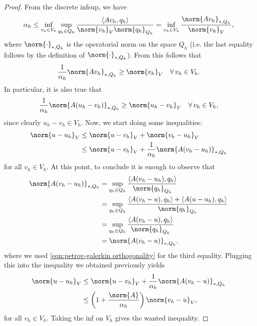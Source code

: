 \begin{proof}
    From the discrete infsup, we have
    \begin{equation*}
        \alpha_h\leq \inf_{v_h\in V_h}\sup_{q_h\in Q_h}\frac{\langle Av_h,q_h \rangle}{\norm{v_h}_V\norm{q_h}_{Q_h}}= \inf_{v_h\in V_h}\frac{\norm{Av_h}_{*,Q_h}}{\norm{v_h}_V},
    \end{equation*}
    where $\norm{\cdot}_{*,Q_h}$ is the operatorial norm on the space $Q_h$ (i.e. the last equality follows by the definition of $\norm{\cdot}_{*,Q_h}$). From this follows that
    \begin{equation*}
        \frac{1}{\alpha_h}\norm{Av_h}_{*,Q_h}\geq\norm{v_h}_V \quad \forall\, v_h\in V_h.
    \end{equation*}
    In particular, it is also true that
    \begin{equation*}
        \frac{1}{\alpha_h}\norm{A(u_h-v_h)}_{*,Q_h}\geq\norm{u_h-v_h}_V \quad \forall\, v_h\in V_h,
    \end{equation*}
    since clearly $u_h-v_h\in V_h$. Now, we start doing some inequalities:
    \begin{align*}
        \norm{u-u_h}_V&\leq\norm{u-v_h}_V+\norm{v_h-u_h}_V\\
        &\leq\norm{u-v_h}_V+\frac{1}{\alpha_h}\norm{A(v_h-u_h)}_{*,Q_h}
    \end{align*}
    for all $v_h\in V_h$. At this point, to conclude it is enough to observe that
    \begin{align*}
        \norm{A(v_h-u_h)}_{*,Q_h}&=\sup_{q_h\in Q_h}\frac{\langle A(v_h-u_h),q_h \rangle}{\norm{q_h}_{Q_h}}\\
        &=\sup_{q_h\in Q_h}\frac{\langle A(v_h-u),q_h \rangle + \langle A(u-u_h),q_h\rangle}{\norm{q_h}_{Q_h}}\\
        &=\sup_{q_h\in Q_h}\frac{\langle A(v_h-u),q_h \rangle}{\norm{q_h}_{Q_h}}\\
        &=\norm{A(v_h-u)}_{*,Q_h},
    \end{align*}
    where we used \eqref{eqn:petrov-galerkin orthogonality} for the third equality. Plugging this into the inequality we obtained previously yields
    \begin{align*}
        \norm{u-u_h}_V&\leq\norm{u-v_h}_V+\frac{1}{\alpha_h}\norm{A(v_h-u)}_{*,Q_h}\\
        &\leq\left( 1+\frac{\norm{A}}{\alpha_h} \right)\norm{v_h-u}_V,
    \end{align*}
    for all $v_h\in V_h$. Taking the inf on $V_h$ gives the wanted inequality.
\end{proof}


